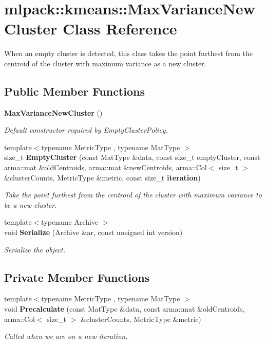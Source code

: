 \section{mlpack\+:\+:kmeans\+:\+:Max\+Variance\+New\+Cluster Class Reference}
\label{classmlpack_1_1kmeans_1_1MaxVarianceNewCluster}


When an empty cluster is detected, this class takes the point furthest from the centroid of the cluster with maximum variance as a new cluster.  


\subsection*{Public Member Functions}
\begin{DoxyCompactItemize}
\item 
{\bf Max\+Variance\+New\+Cluster} ()
\begin{DoxyCompactList}\small\item\em Default constructor required by Empty\+Cluster\+Policy. \end{DoxyCompactList}\item 
{\footnotesize template$<$typename Metric\+Type , typename Mat\+Type $>$ }\\size\+\_\+t {\bf Empty\+Cluster} (const Mat\+Type \&data, const size\+\_\+t empty\+Cluster, const arma\+::mat \&old\+Centroids, arma\+::mat \&new\+Centroids, arma\+::\+Col$<$ size\+\_\+t $>$ \&cluster\+Counts, Metric\+Type \&metric, const size\+\_\+t {\bf iteration})
\begin{DoxyCompactList}\small\item\em Take the point furthest from the centroid of the cluster with maximum variance to be a new cluster. \end{DoxyCompactList}\item 
{\footnotesize template$<$typename Archive $>$ }\\void {\bf Serialize} (Archive \&ar, const unsigned int version)
\begin{DoxyCompactList}\small\item\em Serialize the object. \end{DoxyCompactList}\end{DoxyCompactItemize}
\subsection*{Private Member Functions}
\begin{DoxyCompactItemize}
\item 
{\footnotesize template$<$typename Metric\+Type , typename Mat\+Type $>$ }\\void {\bf Precalculate} (const Mat\+Type \&data, const arma\+::mat \&old\+Centroids, arma\+::\+Col$<$ size\+\_\+t $>$ \&cluster\+Counts, Metric\+Type \&metric)
\begin{DoxyCompactList}\small\item\em Called when we are on a new iteration. \end{DoxyCompactList}\end{DoxyCompactItemize}
